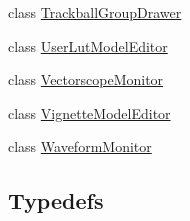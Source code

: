 \begin{DoxyCompactItemize}
class \hyperlink{class_unity_editor_1_1_post_processing_1_1_trackball_group_drawer}{Trackball\+Group\+Drawer}
\item 
class \hyperlink{class_unity_editor_1_1_post_processing_1_1_user_lut_model_editor}{User\+Lut\+Model\+Editor}
\item 
class \hyperlink{class_unity_editor_1_1_post_processing_1_1_vectorscope_monitor}{Vectorscope\+Monitor}
\item 
class \hyperlink{class_unity_editor_1_1_post_processing_1_1_vignette_model_editor}{Vignette\+Model\+Editor}
\item 
class \hyperlink{class_unity_editor_1_1_post_processing_1_1_waveform_monitor}{Waveform\+Monitor}
\end{DoxyCompactItemize}
\subsection*{Typedefs}
